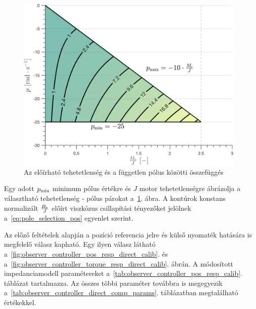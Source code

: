 \begin{figure}[b!]
	\begin{center}
		\includegraphics[height=0.5\textheight]{images/observer_controller_param_limits.png}
		\caption{Az előírható tehetetlenség és a független pólus közötti összefüggés}\label{fig:observer_controller_param_limits}
	\end{center}
\end{figure}
Egy adott \(p_{\mathrm{min}}\) minimum pólus értékre és \(J\) motor tehetetlenségre ábrázolja 
a választható tehetetlenség - pólus párokat a~\ref{fig:observer_controller_param_limits}. ábra.
A kontúrok konstans normalizált \(\frac{B_{\mathrm{e}}}{J}\) előírt viszkózus csillapítási tényezőket jelölnek a~\eqref{eq:pole_selection_pos}
egyenlet szerint.



Az előző feltételek alapján a pozíció referencia jelre és külső nyomaték hatására is megfelelő válasz kapható.
Egy ilyen válasz látható a~\ref{fig:observer_controller_pos_resp_direct_calib}. 
és a~\ref{fig:observer_controller_torque_resp_direct_calib}. ábrán. 
A módosított impedanciamodell paramétereket a~\ref{tab:observer_controller_pos_resp_calib}. táblázat tartalmazza.
Az összes többi paraméter továbbra is megegyezik a~\ref{tab:observer_controller_direct_comp_params}. 
táblázatban megtalálható értékekkel. 

